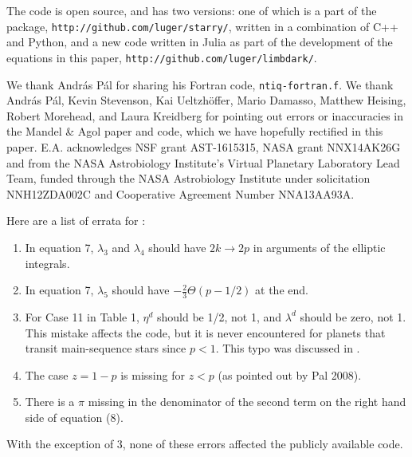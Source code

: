 \documentclass[modern]{aastex61}
\begin{document}
The code is open source, and has two versions:  one of which is a part
of the \starry package, \texttt{http://github.com/luger/starry/}, written
in a combination of C++ and Python, and a new code written in Julia as
part of the development of the equations in this paper,
\texttt{http://github.com/luger/limbdark/}.

\acknowledgements

We thank Andr\'as P\'al for sharing his Fortran code, \texttt{ntiq-fortran.f}.
We thank Andr\'as P\'al, Kevin Stevenson, Kai Ueltzh\"offer, Mario Damasso,
Matthew Heising, Robert Morehead, and Laura Kreidberg for pointing out
errors or inaccuracies in the Mandel \& Agol paper and code, which we have
hopefully rectified in this paper. 
E.A. acknowledges NSF grant AST-1615315, NASA grant NNX14AK26G and from 
the NASA Astrobiology Institute's Virtual Planetary Laboratory Lead Team, 
funded through the NASA Astrobiology Institute under solicitation NNH12ZDA002C 
and Cooperative Agreement Number NNA13AA93A.



\appendix

Here are a list of errata for \citet{MandelAgol2002}:
\begin{enumerate}
\item In equation 7, $\lambda_3$ and $\lambda_4$ should have $2k \rightarrow
2p$ in arguments of the elliptic integrals.

\item In equation 7, $\lambda_5$ should have $- \frac{2}{3}\Theta(p-1/2)$
at the end.

\item For Case 11 in Table 1, $\eta^d$ should be 1/2, not 1, and
$\lambda^d$ should be zero, not 1.  This mistake affects the code,
but it is never encountered for planets that transit main-sequence
stars since $p<1$.  This typo was discussed in \citet{Eastman2013}.

\item The case $z=1-p$ is missing for $z<p$ (as pointed out by
Pal 2008).

\item There is a $\pi$ missing in the denominator of the second term
on the right hand side of equation (8).
\end{enumerate}

With the exception of 3, none of these errors affected the publicly
available code.
\end{document}
